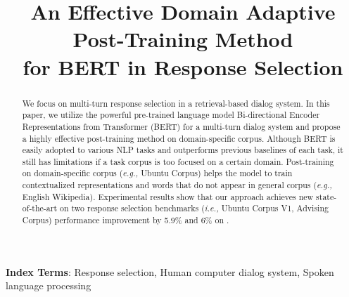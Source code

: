 \documentclass[a4paper]{article}
\title{An Effective Domain Adaptive Post-Training Method \\ for BERT in Response Selection}
\begin{document}
\maketitle
\begin{abstract}
We focus on multi-turn response selection in a retrieval-based dialog system. In this paper, we utilize the powerful pre-trained language model Bi-directional Encoder Representations from Transformer (BERT) for a multi-turn dialog system and propose a highly effective post-training method on domain-specific corpus. Although BERT is easily adopted to various NLP tasks and outperforms previous baselines of each task, it still has limitations if a task corpus is too focused on a certain domain.  Post-training on domain-specific corpus ({\em{e.g.,}} Ubuntu Corpus) helps the model to train contextualized representations and words that do not appear in general corpus ({\em{e.g.,}} English Wikipedia). Experimental results show that our approach achieves new state-of-the-art on two response selection benchmarks ({\em{i.e.,}} Ubuntu Corpus V1, Advising Corpus) performance improvement by 5.9\% and 6\% on .
\end{abstract}

\noindent\textbf{Index Terms}: Response selection, Human computer dialog system, Spoken language processing
\end{document}
